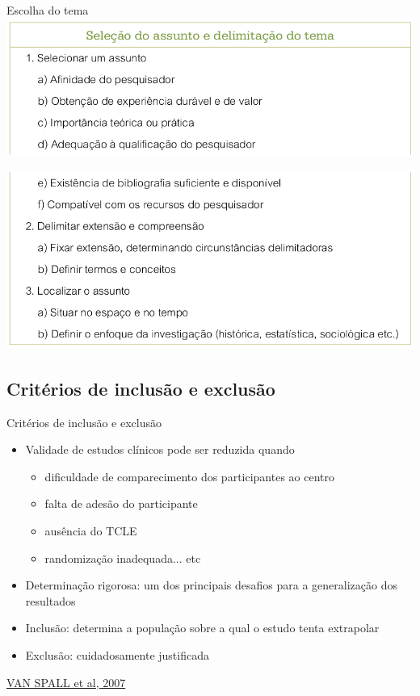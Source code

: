 \documentclass{beamer}
\begin{document}
\begin{frame}{Escolha do tema}
  \includegraphics[width=\textwidth]{Etapas/delimitacao1}

  \includegraphics[width=\textwidth]{Etapas/delimitacao2}
\end{frame}

\subsection{Critérios de inclusão e exclusão}

\begin{frame}{Critérios de inclusão e exclusão}
  \begin{itemize}
    \footnotesize
  \item Validade de estudos clínicos pode ser reduzida quando
    \begin{itemize}
      \scriptsize
    \item dificuldade de comparecimento dos participantes ao centro
    \item falta de adesão do participante
    \item ausência do TCLE
    \item randomização inadequada... etc
    \end{itemize}
    \medskip
  \item Determinação rigorosa: um dos principais desafios para a generalização dos resultados
    \medskip
  \item Inclusão: determina a população sobre a qual o estudo tenta extrapolar
    \medskip
  \item Exclusão: cuidadosamente justificada
  \end{itemize}

  \vfill
  \scriptsize
  \hfill \href{https://doi.org/10.1001/jama.297.11.1233}{VAN SPALL et al, 2007}
\end{frame}
\end{document}
